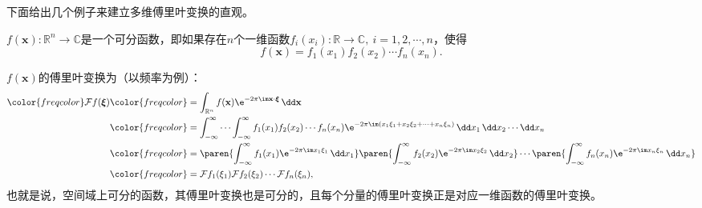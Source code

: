 下面给出几个例子来建立多维傅里叶变换的直观。
\begin{definition}[可分函数]
    $f(\mathbf{x}):\mathbb{R}^n\to\mathbb{C}$是一个可分函数，即如果存在$n$个一维函数$f_i(x_i):\mathbb{R}\to\mathbb{C},\ i=1,2,\cdots,n$，使得
    \begin{equation}
        f(\mathbf{x})=f_1(x_1)f_2(x_2)\cdots f_n(x_n).
    \end{equation}
\end{definition}
$f(\mathbf{x})$的傅里叶变换为（以频率为例）：
\begin{align}
    \color{freqcolor}\mathcal{F}f(\boldsymbol{\xi})&\color{freqcolor}=\int_{\mathbb{R}^n}f(\mathbf{x})\e^{-2\pi\im\mathbf{x}\cdot\boldsymbol{\xi}}\,\dd\mathbf{x}\nonumber\\
    &\color{freqcolor}=\int_{-\infty}^{\infty}\cdots\int_{-\infty}^{\infty}f_1(x_1)f_2(x_2)\cdots f_n(x_n)\e^{-2\pi\im(x_1\xi_1+x_2\xi_2+\cdots+x_n\xi_n)}\,\dd x_1\,\dd x_2\cdots\dd x_n\nonumber\\
    &\color{freqcolor}=\paren{\int_{-\infty}^{\infty}f_1(x_1)\e^{-2\pi\im x_1\xi_1}\,\dd x_1}\paren{\int_{-\infty}^{\infty}f_2(x_2)\e^{-2\pi\im x_2\xi_2}\,\dd x_2}\cdots\paren{\int_{-\infty}^{\infty}f_n(x_n)\e^{-2\pi\im x_n\xi_n}\,\dd x_n}\nonumber\\
    &\color{freqcolor}=\mathcal{F}f_1(\xi_1)\mathcal{F}f_2(\xi_2)\cdots\mathcal{F}f_n(\xi_n),
\end{align}
也就是说，空间域上可分的函数，其傅里叶变换也是可分的，且每个分量的傅里叶变换正是对应一维函数的傅里叶变换。

